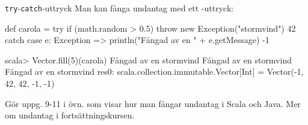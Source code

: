 \begin{Slide}{\texttt{try}-\texttt{catch}-uttryck}\SlideFontSmall
Man kan fånga undantag med ett -uttryck:
\begin{Code}
def carola = try {
  if (math.random > 0.5) throw new Exception("stormvind")
  42
} catch {
  case e: Exception =>
    println("Fångad av en " + e.getMessage)
    -1
}
\end{Code}
\pause
\begin{REPL}
scala> Vector.fill(5)(carola)
Fångad av en stormvind
Fångad av en stormvind
Fångad av en stormvind
res0: scala.collection.immutable.Vector[Int] = Vector(-1, 42, 42, -1, -1)
\end{REPL}
Gör uppg. 9-11 i övn.  som visar hur man fångar undantag i Scala och Java. Mer om undantag i fortsättningskursen.
\end{Slide}
